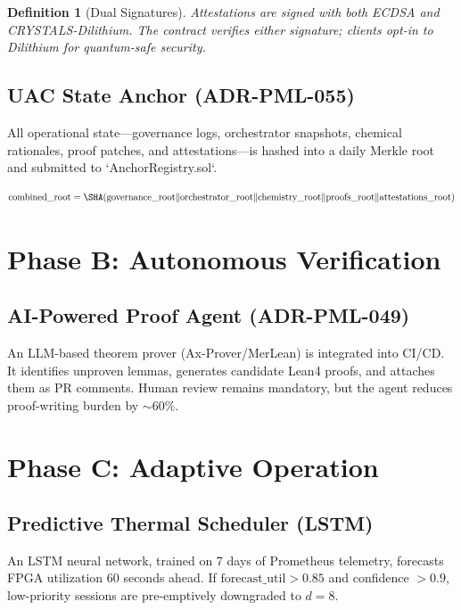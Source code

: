 \documentclass[11pt,a4paper]{article}
\newtheorem{definition}[theorem]{Definition}
\begin{document}
\begin{definition}[Dual Signatures]
Attestations are signed with both ECDSA and CRYSTALS-Dilithium. The contract verifies either signature; clients opt-in to Dilithium for quantum-safe security.
\end{definition}

\subsection{UAC State Anchor (ADR-PML-055)}

All operational state—governance logs, orchestrator snapshots, chemical rationales, proof patches, and attestations—is hashed into a daily Merkle root and submitted to `AnchorRegistry.sol`.

\begin{equation}
    \text{combined\_root} = \SHA(\text{governance\_root} \| \text{orchestrator\_root} \| \text{chemistry\_root} \| \text{proofs\_root} \| \text{attestations\_root})
\end{equation}

\section{Phase B: Autonomous Verification}

\subsection{AI-Powered Proof Agent (ADR-PML-049)}

An LLM-based theorem prover (Ax-Prover/MerLean) is integrated into CI/CD. It identifies unproven lemmas, generates candidate Lean4 proofs, and attaches them as PR comments. Human review remains mandatory, but the agent reduces proof-writing burden by $\sim60\%$.

\section{Phase C: Adaptive Operation}

\subsection{Predictive Thermal Scheduler (LSTM)}

An LSTM neural network, trained on 7 days of Prometheus telemetry, forecasts FPGA utilization 60 seconds ahead. If $\text{forecast\_util} > 0.85$ and confidence $> 0.9$, low-priority sessions are pre-emptively downgraded to $d=8$.
\end{document}

